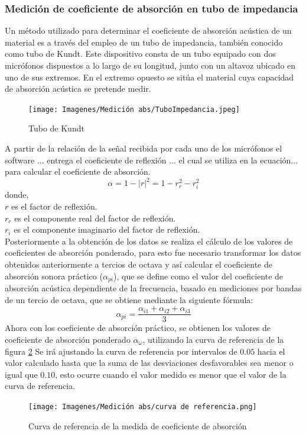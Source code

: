 \subsubsection{Medición de coeficiente de absorción en tubo de impedancia}
Un método utilizado para determinar el coeficiente de absorción acústica de un material es a través del empleo de un tubo de impedancia, también conocido como tubo de Kundt. Este dispositivo consta de un tubo equipado con dos micrófonos dispuestos a lo largo de su longitud, junto con un altavoz ubicado en uno de sus extremos. En el extremo opuesto se sitúa el material cuya capacidad de absorción acústica se pretende medir.
\begin{figure}[H]
    \centering
    \texttt{[image: Imagenes/Medición abs/TuboImpedancia.jpeg]}
    \caption{Tubo de Kundt}
    \label{fig: Tubo de Kundt}
\end{figure}
A partir de la relación de la señal recibida por cada uno de los micrófonos el software ... entrega el coeficiente de reflexión ... el cual se utiliza en la ecuación... para calcular el coeficiente de absorción.
\begin{equation} \label{eq: alpha}
    \alpha = 1 - |r|^2 = 1 - r_{r}^2 - r_{i}^2
\end{equation}
donde,\\
$r$ es el factor de reflexión.\\
$r_{r}$ es el componente real del factor de reflexión.\\
$r_{i}$ es el componente imaginario del factor de reflexión.\\
Posteriormente a la obtención de los datos se realiza el cálculo de los valores de coeficientes de
absorción ponderado, para esto fue necesario transformar los datos obtenidos anteriormente a tercios
de octava y así calcular el coeficiente de absorción sonora práctico ($\alpha_{pi}$), que se define como el valor
del coeficiente de absorción acústica dependiente de la frecuencia, basado en mediciones por bandas
de un tercio de octava, que se obtiene mediante la siguiente fórmula:
\begin{equation}
    \alpha_{pi} = \frac{\alpha_{i1} + \alpha_{i2} + \alpha_{i3}}{3}
\end{equation}
Ahora con los coeficiente de absorción práctico, se obtienen los valores de coeficiente de absorción
ponderado $\alpha_{\omega}$, utilizando la curva de referencia de la figura \ref{fig: curva de referencia} Se irá ajustando la curva de referencia
por intervalos de $0.05$ hacia el valor calculado hasta que la suma de las desviaciones desfavorables
sea menor o igual que $0.10$, esto ocurre cuando el valor medido es menor que el valor de la curva de
referencia.
\begin{figure}[H]
    \centering
    \texttt{[image: Imagenes/Medición abs/curva de referencia.png]}
    \caption{Curva de referencia de la medida de coeficiente de absorción}
    \label{fig: curva de referencia}
\end{figure}

